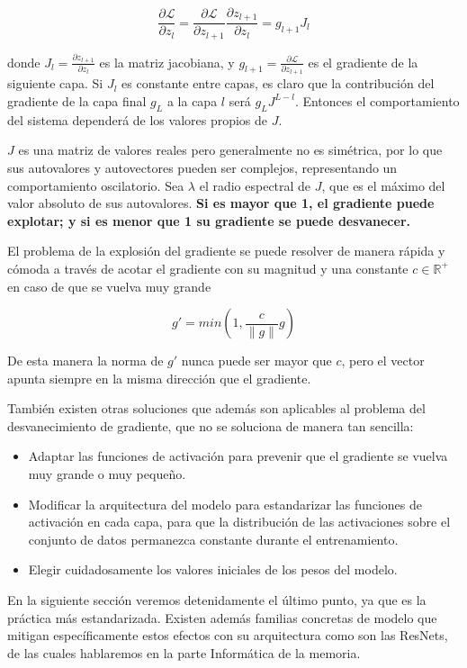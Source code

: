 $$\frac{\partial \mathcal{L}}{\partial z_l} = \frac{\partial \mathcal{L}}{\partial z_{l+1}} \frac{\partial z_{l+1}}{\partial z_l} = g_{l+1} J_l$$

donde $J_l = \frac{\partial z_{l+1}}{\partial z_l}$ es la matriz jacobiana, y $g_{l+1} = \frac{\partial \mathcal{L}}{\partial z_{l+1}}$ es el gradiente de la siguiente capa. Si $J_l$ es constante entre capas, es claro que la contribución del gradiente de la capa final $g_L$ a la capa $l$ será $ g_L J^{L-l}$. Entonces el comportamiento del sistema dependerá de los valores propios de $J$. %

$J$ es una matriz de valores reales pero generalmente no es simétrica, por lo que sus autovalores y autovectores pueden ser complejos, representando un comportamiento oscilatorio. Sea $\lambda$ el radio espectral de $J$, que es el máximo del valor absoluto de sus autovalores. \textbf{Si es mayor que 1, el gradiente puede explotar; y si es menor que 1 su gradiente se puede desvanecer. }

El problema de la explosión del gradiente se puede resolver de manera rápida y cómoda a través de acotar el gradiente con su magnitud y una constante $c \in \mathbb{R}^+$ en caso de que se vuelva muy grande

$$g' = min(1, \frac{c}{\|g\|}g)$$

De esta manera la norma de $g'$ nunca puede ser mayor que $c$, pero el vector apunta siempre en la misma dirección que el gradiente.

También existen otras soluciones que además son aplicables al problema del desvanecimiento de gradiente, que no se soluciona de manera tan sencilla:

\begin{itemize}
    \item Adaptar las funciones de activación para prevenir que el gradiente se vuelva muy grande o muy pequeño.

    \item Modificar la arquitectura del modelo para estandarizar las funciones de activación en cada capa, para que la distribución de las activaciones sobre el conjunto de datos permanezca constante durante el entrenamiento.

    \item Elegir cuidadosamente los valores iniciales de los pesos del modelo.
   
\end{itemize}

En la siguiente sección veremos detenidamente el último punto, ya que es la práctica más estandarizada. Existen además familias concretas de modelo que mitigan específicamente estos efectos con su arquitectura como son las ResNets, de las cuales hablaremos en la parte Informática de la memoria.


